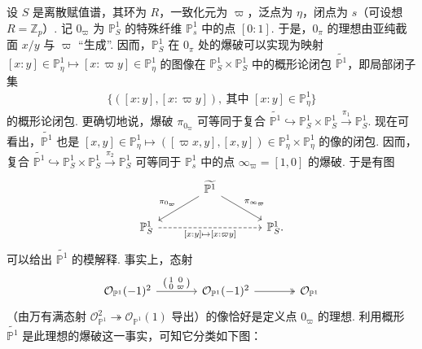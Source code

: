 \begin{example}\label{item:ag-2-3-3}
设 $S$ 是离散赋值谱，其环为 $R$，一致化元为 $\varpi$，泛点为 $\eta$，闭点为 $s$（可设想 $R=\mathbb Z_p$）. 记 $0_{\varpi}$ 为 $\mathbb P_S^1$ 的特殊纤维 $\mathbb P_s^1$ 中的点 $[0:1]$. 于是，$0_{\pi}$ 的理想由亚纯截面 $x/y$ 与 $\varpi$ ``生成''. 因而，$\mathbb P_S^1$ 在 $0_{\pi}$ 处的爆破可以实现为映射 $[x:y]\in\mathbb P_\eta^1\mapsto[x:\varpi y]\in\mathbb P_\eta^1$ 的图像在 $\mathbb P_S^1\times\mathbb P_S^1$ 中的概形论闭包 $\widetilde{\mathbb P^1}$，即局部闭子集
\begin{align*}
\{([x:y],[x:\varpi y]),\ \text{其中 }[x:y]\in\mathbb P_\eta^1\}
\end{align*}
的概形论闭包. 更确切地说，爆破 $\pi_{0_{\varpi}}$ 可等同于复合 $\widetilde{\mathbb P^1}\hookrightarrow\mathbb P_S^1\times\mathbb P_S^1\xrightarrow{\pi_1}\mathbb P_S^1$. 现在可看出，$\widetilde{\mathbb P^1}$ 也是 $[x,y]\in\mathbb P_\eta^1\mapsto([\varpi x,y],[x,y])\in\mathbb P_\eta^1\times\mathbb P_\eta^1$ 的像的闭包. 因而，复合 $\widetilde{\mathbb P^1}\hookrightarrow\mathbb P_S^1\times\mathbb P_S^1\xrightarrow{\pi_2}\mathbb P_S^1$ 可等同于 $\mathbb P_s^1$ 中的点 $\infty_{\varpi}=[1,0]$ 的爆破. 于是有图
\begin{align*}
\begin{tikzcd}[ampersand replacement=\&,column sep=large]
\& \widetilde{\mathbb P^1}\arrow[dl,"\pi_{0_{\varpi}}"']\arrow[dr,"\pi_{\infty_{\varpi}}"] \& \\
\mathbb P_S^1\arrow[rr,dashed,"{[x:y]\mapsto[x:\varpi y]}"'] \& \& \mathbb P_S^1.
\end{tikzcd}
\end{align*}
可以给出 $\widetilde{\mathbb P^1}$ 的模解释. 事实上，态射
\begin{align*}
\begin{tikzcd}[ampersand replacement=\&,column sep=large]
\mathcal O_{\mathbb P^1}(-1)^2\arrow[r,"{\left(\begin{smallmatrix}1&0\\0&\varpi\end{smallmatrix}\right)}"] \& \mathcal O_{\mathbb P^1}(-1)^2\arrow[r,two heads] \& \mathcal O_{\mathbb P^1}
\end{tikzcd}
\end{align*}
（由万有满态射 $\mathcal O_{\mathbb P^1}^2\twoheadrightarrow\mathcal O_{\mathbb P^1}(1)$ 导出）的像恰好是定义点 $0_{\varpi}$ 的理想. 利用概形 $\widetilde{\mathbb P^1}$ 是此理想的爆破这一事实，可知它分类如下图：
\begin{align*}
\begin{tikzcd}[ampersand replacement=\&]

\end{tikzcd}
\end{align*}
\end{example}
